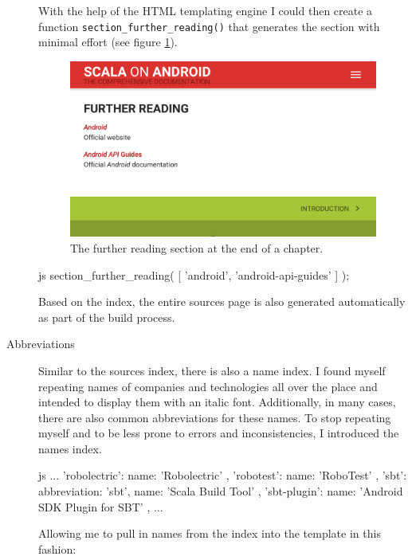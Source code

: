 \begin{description}
	With the help of the \ac{HTML} templating engine I could then create a function \texttt{section\_further\_reading()} that generates the section with minimal effort (see figure \ref{further-reading}).

	\begin{figure}[]
		\includegraphics[width=\textwidth]{asset/further-reading.png}
		\caption{The further reading section at the end of a chapter.}
		\label{further-reading}
	\end{figure}

	\begin{code}{js}
section_further_reading( [ 'android', 'android-api-guides' ] );
	\end{code}

	Based on the index, the entire sources page is also generated automatically as part of the build process.

	\item[Abbreviations]\hfill

	Similar to the sources index, there is also a name index. I found myself repeating names of companies and technologies all over the place and intended to display them with an italic font. Additionally, in many cases, there are also common abbreviations for these names. To stop repeating myself and to be less prone to errors and inconsistencies, I introduced the names index.

	\begin{code}{js}
...
'robolectric': { name: 'Robolectric' },
'robotest': { name: 'RoboTest' },
'sbt':
{
	abbreviation: 'sbt',
	name: 'Scala Build Tool'
},
'sbt-plugin': { name: 'Android SDK Plugin for SBT' },
...
	\end{code}

	Allowing me to pull in names from the index into the template in this fashion:


\end{description}

